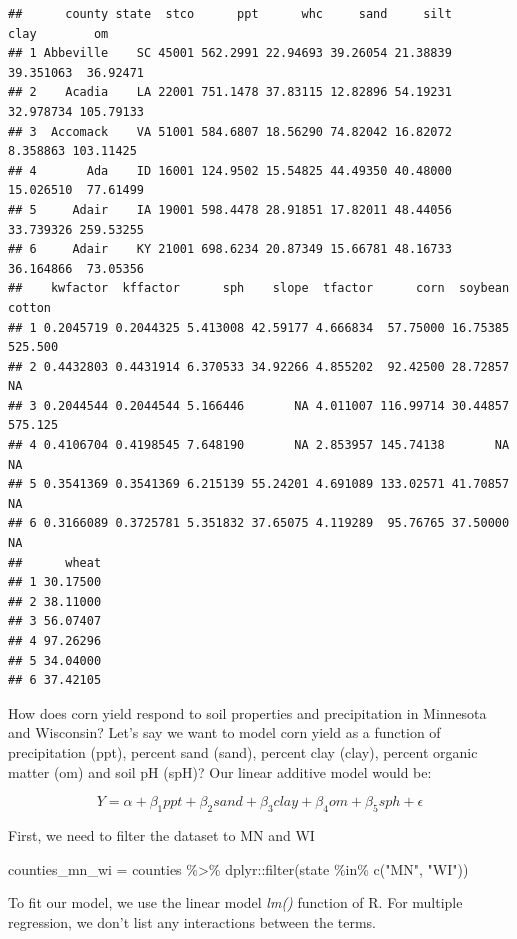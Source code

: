 \documentclass[
]{book}
\newenvironment{Shaded}{\begin{snugshade}}{\end{snugshade}}
\newcommand{\FunctionTok}[1]{\textcolor[rgb]{0.00,0.00,0.00}{#1}}
\newcommand{\NormalTok}[1]{#1}
\newcommand{\OtherTok}[1]{\textcolor[rgb]{0.56,0.35,0.01}{#1}}
\newcommand{\SpecialCharTok}[1]{\textcolor[rgb]{0.00,0.00,0.00}{#1}}
\newcommand{\StringTok}[1]{\textcolor[rgb]{0.31,0.60,0.02}{#1}}
\begin{document}
\begin{verbatim}
##      county state  stco      ppt      whc     sand     silt      clay        om
## 1 Abbeville    SC 45001 562.2991 22.94693 39.26054 21.38839 39.351063  36.92471
## 2    Acadia    LA 22001 751.1478 37.83115 12.82896 54.19231 32.978734 105.79133
## 3  Accomack    VA 51001 584.6807 18.56290 74.82042 16.82072  8.358863 103.11425
## 4       Ada    ID 16001 124.9502 15.54825 44.49350 40.48000 15.026510  77.61499
## 5     Adair    IA 19001 598.4478 28.91851 17.82011 48.44056 33.739326 259.53255
## 6     Adair    KY 21001 698.6234 20.87349 15.66781 48.16733 36.164866  73.05356
##    kwfactor  kffactor      sph    slope  tfactor      corn  soybean  cotton
## 1 0.2045719 0.2044325 5.413008 42.59177 4.666834  57.75000 16.75385 525.500
## 2 0.4432803 0.4431914 6.370533 34.92266 4.855202  92.42500 28.72857      NA
## 3 0.2044544 0.2044544 5.166446       NA 4.011007 116.99714 30.44857 575.125
## 4 0.4106704 0.4198545 7.648190       NA 2.853957 145.74138       NA      NA
## 5 0.3541369 0.3541369 6.215139 55.24201 4.691089 133.02571 41.70857      NA
## 6 0.3166089 0.3725781 5.351832 37.65075 4.119289  95.76765 37.50000      NA
##      wheat
## 1 30.17500
## 2 38.11000
## 3 56.07407
## 4 97.26296
## 5 34.04000
## 6 37.42105
\end{verbatim}

How does corn yield respond to soil properties and precipitation in Minnesota and Wisconsin? Let's say we want to model corn yield as a function of precipitation (ppt), percent sand (sand), percent clay (clay), percent organic matter (om) and soil pH (spH)? Our linear additive model would be:

\[ Y = \alpha + \beta _1 ppt + \beta _2 sand + \beta _3 clay + \beta _4 om + \beta _5 sph + \epsilon\]

First, we need to filter the dataset to MN and WI

\begin{Shaded}
\begin{Highlighting}[]
\NormalTok{counties\_mn\_wi }\OtherTok{=}\NormalTok{ counties }\SpecialCharTok{\%\textgreater{}\%}
\NormalTok{  dplyr}\SpecialCharTok{::}\FunctionTok{filter}\NormalTok{(state }\SpecialCharTok{\%in\%} \FunctionTok{c}\NormalTok{(}\StringTok{"MN"}\NormalTok{, }\StringTok{"WI"}\NormalTok{))}
\end{Highlighting}
\end{Shaded}

To fit our model, we use the linear model \emph{lm()} function of R. For multiple regression, we don't list any interactions between the terms.
\end{document}
